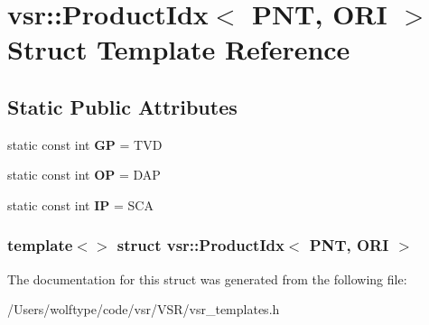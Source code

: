 \hypertarget{structvsr_1_1_product_idx_3_01_p_n_t_00_01_o_r_i_01_4}{\section{vsr\-:\-:Product\-Idx$<$ P\-N\-T, O\-R\-I $>$ Struct Template Reference}
\label{structvsr_1_1_product_idx_3_01_p_n_t_00_01_o_r_i_01_4}
}
\subsection*{Static Public Attributes}
\begin{DoxyCompactItemize}
\item 
\hypertarget{structvsr_1_1_product_idx_3_01_p_n_t_00_01_o_r_i_01_4_a5659042141886cafb8acc0ec252f9418}{static const int {\bfseries G\-P} = T\-V\-D}\label{structvsr_1_1_product_idx_3_01_p_n_t_00_01_o_r_i_01_4_a5659042141886cafb8acc0ec252f9418}

\item 
\hypertarget{structvsr_1_1_product_idx_3_01_p_n_t_00_01_o_r_i_01_4_a7f98d227a1e76f23d3ad7e6449605fbc}{static const int {\bfseries O\-P} = D\-A\-P}\label{structvsr_1_1_product_idx_3_01_p_n_t_00_01_o_r_i_01_4_a7f98d227a1e76f23d3ad7e6449605fbc}

\item 
\hypertarget{structvsr_1_1_product_idx_3_01_p_n_t_00_01_o_r_i_01_4_a6a1e26b59d823537b3a227b22fb6ace1}{static const int {\bfseries I\-P} = S\-C\-A}\label{structvsr_1_1_product_idx_3_01_p_n_t_00_01_o_r_i_01_4_a6a1e26b59d823537b3a227b22fb6ace1}

\end{DoxyCompactItemize}
\subsubsection*{template$<$$>$ struct vsr\-::\-Product\-Idx$<$ P\-N\-T, O\-R\-I $>$}



The documentation for this struct was generated from the following file\-:\begin{DoxyCompactItemize}
\item 
/\-Users/wolftype/code/vsr/\-V\-S\-R/vsr\-\_\-templates.\-h\end{DoxyCompactItemize}

